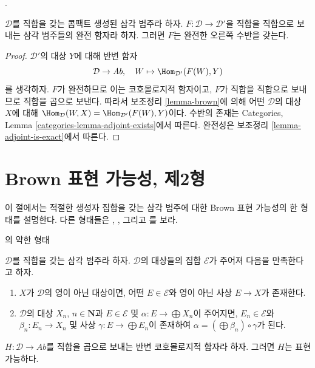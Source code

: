 \begin{proposition}
\label{proposition-brown}
\begin{reference}
\cite[Theorem 4.1]{Neeman-Grothendieck}.
\end{reference}
$\mathcal{D}$를 직합을 갖는 콤팩트 생성된 삼각 범주라 하자.
$F : \mathcal{D} \to \mathcal{D}'$을 직합을 직합으로 보내는 삼각
범주들의 완전 함자라 하자. 그러면 $F$는 완전한 오른쪽 수반을 갖는다.
\end{proposition}

\begin{proof}
$\mathcal{D}'$의 대상 $Y$에 대해 반변 함자
$$
\mathcal{D} \to \textit{Ab},\quad W \mapsto \Hom_{\mathcal{D}'}(F(W), Y)
$$
를 생각하자. $F$가 완전하므로 이는 코호몰로지적 함자이고, $F$가
직합을 직합으로 보내므로 직합을 곱으로 보낸다. 따라서 보조정리
\ref{lemma-brown}에 의해 어떤 $\mathcal{D}$의 대상 $X$에 대해
$\Hom_\mathcal{D}(W, X) = \Hom_{\mathcal{D}'}(F(W), Y)$이다.
수반의 존재는 Categories, Lemma \ref{categories-lemma-adjoint-exists}에서
따른다. 완전성은 보조정리 \ref{lemma-adjoint-is-exact}에서 따른다.
\end{proof}

\section{Brown 표현 가능성, 제2형}
\label{section-brown-bis}

\noindent
이 절에서는 적절한 생성자 집합을 갖는 삼각 범주에 대한 Brown 표현
가능성의 한 형태를 설명한다. 다른 형태들은 \cite{Franke},
\cite{Neeman}, 그리고 \cite{Krause}를 보라.

\begin{lemma}
\label{lemma-brown-bis}
\begin{reference}
\cite[Theorem A]{Krause}의 약한 형태
\end{reference}
$\mathcal{D}$를 직합을 갖는 삼각 범주라 하자. $\mathcal{D}$의 대상들의
집합 $\mathcal{E}$가 주어져 다음을 만족한다고 하자.
\begin{enumerate}
\item $X$가 $\mathcal{D}$의 영이 아닌 대상이면, 어떤
$E \in \mathcal{E}$와 영이 아닌 사상 $E \to X$가 존재한다.
\item $\mathcal{D}$의 대상 $X_n$, $n \in \mathbf{N}$과
$E \in \mathcal{E}$ 및 $\alpha : E \to \bigoplus X_n$이 주어지면,
$E_n \in \mathcal{E}$와 $\beta_n : E_n \to X_n$ 및 사상
$\gamma : E \to \bigoplus E_n$이 존재하여
$\alpha = (\bigoplus \beta_n) \circ \gamma$가 된다.
\end{enumerate}
$H : \mathcal{D} \to \textit{Ab}$를 직합을 곱으로 보내는 반변
코호몰로지적 함자라 하자. 그러면 $H$는 표현 가능하다.
\end{lemma}

